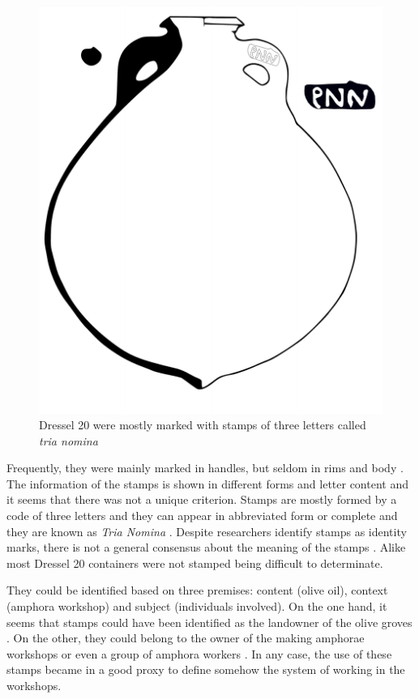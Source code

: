 \documentclass[review]{elsarticle}
\begin{document}
\begin{figure}[htp]
	\centering
\includegraphics[scale=0.5]{figs/dressel20}
\caption{Dressel 20 were mostly marked with stamps of three letters called \textit{tria nomina}}
\label{amphora}
\end{figure} 

Frequently, they were mainly marked in handles, but seldom in rims and body \citep{millet_anforas_1998}. 
The information of the stamps is shown in different forms and letter content and it seems that there was not a unique criterion. Stamps are mostly formed by a code of three letters and they can appear in abbreviated form or complete and they are known as \textit{Tria Nomina} \citep{berni_millet_amphora_1996}. Despite researchers identify stamps as identity marks, there is not a general consensus about the meaning of the stamps \citep{rodriguez_baetican_1998}. Alike most Dressel 20 containers were not stamped being difficult to determinate. 

They could be identified based on three premises: content (olive oil), context (amphora workshop) and subject (individuals involved). On the one hand, it seems that stamps could have been identified as the landowner of the olive groves \citep{rodriguez_economioleicola_1977}. On the other, they could belong to the owner of the making amphorae workshops or even a group of amphora workers \citep{berni_millet_epigrafianforica_2008}. In any case, the use of these stamps became in a good proxy to define somehow the system of working in the workshops. 
\end{document}
